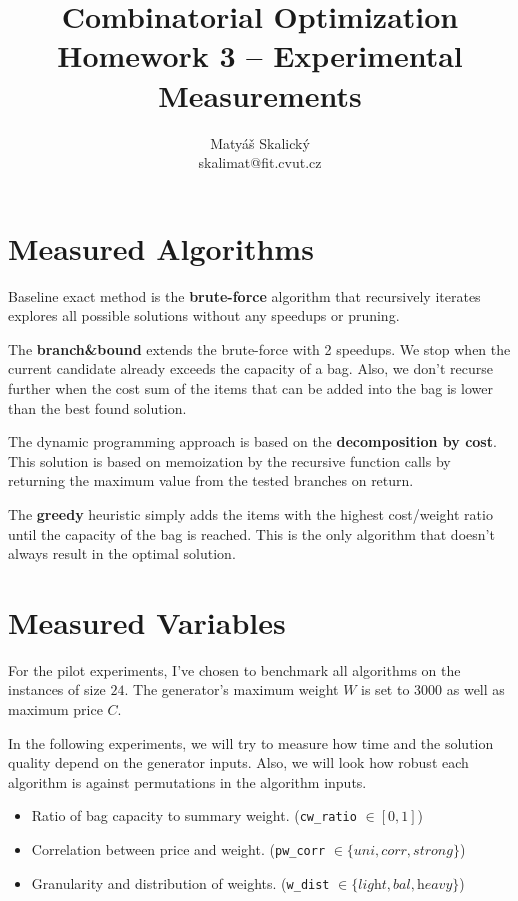 \documentclass[a4paper,10pt]{article}
\title{Combinatorial Optimization\\Homework 3 – Experimental Measurements}
\author{Matyáš Skalický\\skalimat@fit.cvut.cz}
\begin{document}
\maketitle
\tableofcontents
\medskip


\section{Measured Algorithms}

Baseline exact method is the \textbf{brute-force} algorithm that recursively iterates explores all possible solutions without any speedups or pruning.

The \textbf{branch\&bound} extends the brute-force with 2 speedups. We stop when the current candidate already exceeds the capacity of a bag. Also, we don't recurse further when the cost sum of the items that can be added into the bag is lower than the best found solution.

The dynamic programming approach is based on the \textbf{decomposition by cost}. This solution is based on memoization by the recursive function calls by returning the maximum value from the tested branches on return.

The \textbf{greedy} heuristic simply adds the items with the highest cost/weight ratio until the capacity of the bag is reached. This is the only algorithm that doesn't always result in the optimal solution.

\section{Measured Variables}
For the pilot experiments, I've chosen to benchmark all algorithms on the instances of size $24$. The generator's maximum weight $W$ is set to $3000$ as well as maximum price $C$.

In the following experiments, we will try to measure how time and the solution quality depend on the generator inputs. Also, we will look how robust each algorithm is against permutations in the algorithm inputs.

\begin{itemize}
	\item Ratio of bag capacity to summary weight. (\lstinline{cw_ratio} $\in [0, 1]$)
	\item Correlation between price and weight. (\lstinline{pw_corr} $\in \{\textit{uni}, \textit{corr}, \textit{strong}\}$)
	\item Granularity and distribution of weights. (\lstinline{w_dist} $\in \{\textit{light}, \textit{bal}, \textit{heavy}\}$)
\end{itemize}
\end{document}
